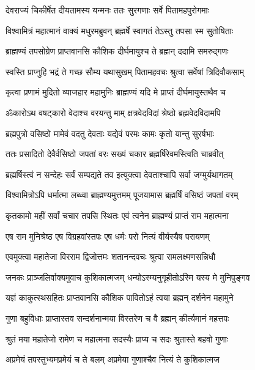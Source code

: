 \twolineshloka
{देवराज्यं चिकीर्षेत दीयतामस्य यन्मनः}
{ततः सुरगणाः सर्वे पितामहपुरोगमाः} %

\twolineshloka
{विश्वामित्रं महात्मानं वाक्यं मधुरमब्रुवन्}
{ब्रह्मर्षे स्वागतं तेऽस्तु तपसा स्म सुतोषिताः} %

\twolineshloka
{ब्राह्मण्यं तपसोग्रेण प्राप्तवानसि कौशिक}
{दीर्घमायुश्च ते ब्रह्मन् ददामि समरुद्गणः} %

\twolineshloka
{स्वस्ति प्राप्नुहि भद्रं ते गच्छ सौम्य यथासुखम्}
{पितामहवचः श्रुत्वा सर्वेषां त्रिदिवौकसाम्} %

\twolineshloka
{कृत्वा प्रणामं मुदितो व्याजहार महामुनिः}
{ब्राह्मण्यं यदि मे प्राप्तं दीर्घमायुस्तथैव च} %

\twolineshloka
{ॐकारोऽथ वषट्कारो वेदाश्च वरयन्तु माम्}
{क्षत्रवेदविदां श्रेष्ठो ब्रह्मवेदविदामपि} %

\twolineshloka
{ब्रह्मपुत्रो वसिष्ठो मामेवं वदतु देवताः}
{यद्येवं परमः कामः कृतो यान्तु सुरर्षभाः} %

\twolineshloka
{ततः प्रसादितो देवैर्वसिष्ठो जपतां वरः}
{सख्यं चकार ब्रह्मर्षिरेवमस्त्विति चाब्रवीत्} %

\twolineshloka
{ब्रह्मर्षिस्त्वं न सन्देहः सर्वं सम्पद्यते तव}
{इत्युक्त्वा देवताश्चापि सर्वा जग्मुर्यथागतम्} %

\twolineshloka
{विश्वामित्रोऽपि धर्मात्मा लब्ध्वा ब्राह्मण्यमुत्तमम्}
{पूजयामास ब्रह्मर्षिं वसिष्ठं जपतां वरम्} %

\twolineshloka
{कृतकामो महीं सर्वां चचार तपसि स्थितः}
{एवं त्वनेन ब्राह्मण्यं प्राप्तं राम महात्मना} %

\twolineshloka
{एष राम मुनिश्रेष्ठ एष विग्रहवांस्तपः}
{एष धर्मः परो नित्यं वीर्यस्यैष परायणम्} %

\twolineshloka
{एवमुक्त्वा महातेजा विरराम द्विजोत्तमः}
{शतानन्दवचः श्रुत्वा रामलक्ष्मणसन्निधौ} %

\twolineshloka
{जनकः प्राञ्जलिर्वाक्यमुवाच कुशिकात्मजम्}
{धन्योऽस्म्यनुगृहीतोऽस्मि यस्य मे मुनिपुङ्गव} %

\twolineshloka
{यज्ञं काकुत्स्थसहितः प्राप्तवानसि कौशिक}
{पावितोऽहं त्वया ब्रह्मन् दर्शनेन महामुने} %

\twolineshloka
{गुणा बहुविधाः प्राप्तास्तव सन्दर्शनान्मया}
{विस्तरेण च वै ब्रह्मन् कीर्त्यमानं महत्तपः} %

\twolineshloka
{श्रुतं मया महातेजो रामेण च महात्मना}
{सदस्यैः प्राप्य च सदः श्रुतास्ते बहवो गुणाः} %

\twolineshloka
{अप्रमेयं तपस्तुभ्यमप्रमेयं च ते बलम्}
{अप्रमेया गुणाश्चैव नित्यं ते कुशिकात्मज} %


